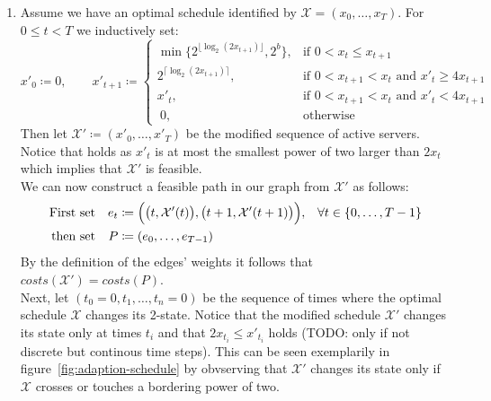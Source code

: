 \documentclass[hidelinks]{article}
\makeatletter
\renewenvironment{proof}[1][\proofname]{\par
  \vspace{-\parskip}%
  \pushQED{\qed}%
  \normalfont
  \topsep0pt \partopsep0pt %
  \trivlist
  \item[\hskip\labelsep
        \itshape
    #1\@addpunct{.}]\ignorespaces
}{%
  \popQED\endtrivlist\@endpefalse
  \addvspace{6pt plus 6pt} %
}
\theoremstyle{plain}
\theoremstyle{definition}
\theoremstyle{rem}
\newcommand{\mx}{\mathcal{X}}
\newcommand{\fromto}[2]{\{#1,\ldots,#2\}}
\makeatother
\begin{document}
\begin{proof}
$ $
\begin{enumerate}
	\item Assume we have an optimal schedule identified by $\mx=(x_0,\ldots,x_T)$. For $0\le t<T$ we inductively set:
\begin{equation}
	x'_0\coloneqq 0,\qquad
	x'_{t+1}\coloneqq 
	\begin{cases}
		\min\bigl\{2^{\lfloor \log_2(2x_{t+1})\rfloor},2^b\bigr\}, & \text{if $0<x_t\le x_{t+1}$}\\
		2^{\lceil \log_2(2x_{t+1})\rceil}, & \text{if $0<x_{t+1}<x_t$ and $x'_{t}\ge4x_{t+1}$}\\
		x'_t, & \text{if $0<x_{t+1}<x_t$ and $x'_{t}<4x_{t+1}$}\\
		\		   0, & \text{otherwise}
	\end{cases} \label{def:chi_prime}
\end{equation}
Then let $\mx'\coloneqq(x'_0,\ldots,x'_T)$ be the modified sequence of active servers. Notice that  holds as $x'_t$ is at most the smallest power of two larger than $2x_t$ which implies that $\mx'$ is feasible.\\
We can now construct a feasible path in our graph from $\mathcal{X'}$ as follows:
\begin{align*}
	\text{First set}&&e_t&\coloneqq\Bigl(\bigl(t,\mx'(t)\bigr),\bigl(t+1,\mx'(t+1)\bigr)\Bigr),&\forall t\in\fromto{0}{T-1}\\
	\text{then set}&&P&\coloneqq(e_0,\ldots,e_{T-1})
\end{align*}
By the definition of the edges' weights it follows that $costs(\mx')=costs(P)$.\\
Next, let $(t_0=0,t_1,\ldots,t_n=0)$ be the sequence of times where the optimal schedule $\mx$ changes its 2-state. Notice that the modified schedule $\mx'$ changes its state only at times $t_i$ and that $2x_{t_i}\le x'_{t_i}$ holds (TODO: only if not discrete but continous time steps). This can be seen exemplarily in figure~\ref{fig:adaption-schedule} by obvserving that $\mx'$ changes its state only if $\mx$ crosses or touches a bordering power of two.
\begin{figure}[H]
\centering
\scalebox{0.7}{
\subfloat{
\begin{tikzpicture}
	\begin{axis}[%
	    ,xlabel=$t$
	    ,axis x line = bottom,axis y line = left
	    ,ytick={1,2,4,8,16}
	    ,ymax=17 %
	    ,xmax=9.9
	    ,legend pos=outer north east
	    ]

\end{axis}
\end{tikzpicture}}}
\end{figure}
\end{enumerate}
\end{proof}
\end{document}
